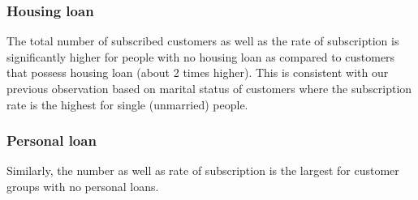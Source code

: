 \subsubsection*{Housing loan}
The total number of subscribed customers as well as the rate of subscription is significantly higher for people with no housing loan as compared to customers that possess housing loan (about 2 times higher). This is consistent with our previous observation based on marital status of customers where the subscription rate is the highest for single (unmarried) people.

\subsubsection*{Personal loan}
Similarly, the number as well as rate of subscription is the largest for customer groups with no personal loans.

